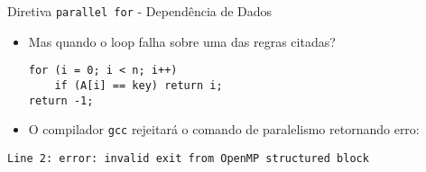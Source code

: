 \begin{frame}[fragile]{Diretiva {\tt parallel for}  - Dependência de Dados}
	\begin{itemize}
		\item Mas quando o loop falha sobre uma das regras citadas?

			\pause

	\begin{lstlisting}
for (i = 0; i < n; i++)
	if (A[i] == key) return i;
return -1;
	\end{lstlisting}

			\pause

		\item O compilador \verb&gcc& rejeitará o comando de paralelismo retornando erro:

	\end{itemize}

		\bigskip	

	\verb&Line 2: error: invalid exit from OpenMP structured block&
\end{frame}




